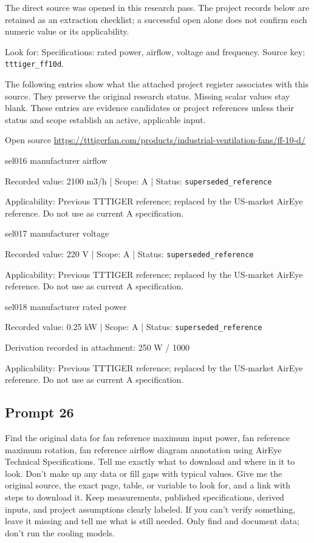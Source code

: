 The direct source was opened in this research pass. The project records below are retained as an extraction checklist; a successful open alone does not confirm each numeric value or its applicability.

Look for: Specifications: rated power, airflow, voltage and frequency. Source key: \nolinkurl{tttiger_ff10d}.

The following entries show what the attached project register associates with this source. They preserve the original research status. Missing scalar values stay blank. These entries are evidence candidates or project references unless their status and scope establish an active, applicable input.

Open source  \url{https://tttigerfan.com/products/industrial-ventilation-fans/ff-10-d/}

sel016  manufacturer airflow

Recorded value: 2100 m3/h | Scope: A | Status: \nolinkurl{superseded_reference}

Applicability: Previous TTTIGER reference; replaced by the US-market AirEye reference. Do not use as current A specification.

sel017  manufacturer voltage

Recorded value: 220 V | Scope: A | Status: \nolinkurl{superseded_reference}

Applicability: Previous TTTIGER reference; replaced by the US-market AirEye reference. Do not use as current A specification.

sel018  manufacturer rated power

Recorded value: 0.25 kW | Scope: A | Status: \nolinkurl{superseded_reference}

Derivation recorded in attachment: 250 W / 1000

Applicability: Previous TTTIGER reference; replaced by the US-market AirEye reference. Do not use as current A specification.

\subsection*{Prompt 26}
Find the original data for fan reference maximum input power, fan reference maximum rotation, fan reference airflow diagram annotation using AirEye Technical Specifications. Tell me exactly what to download and where in it to look. Don’t make up any data or fill gaps with typical values. Give me the original source, the exact page, table, or variable to look for, and a link with steps to download it. Keep measurements, published specifications, derived inputs, and project assumptions clearly labeled. If you can’t verify something, leave it missing and tell me what is still needed. Only find and document data; don’t run the cooling models.

